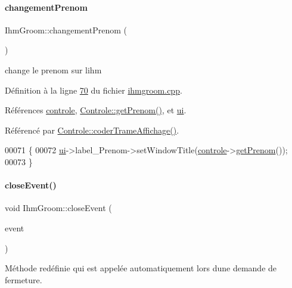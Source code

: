 \paragraph{\texorpdfstring{changement\+Prenom}{changementPrenom}}
{\footnotesize\ttfamily Ihm\+Groom\+::changement\+Prenom (\begin{DoxyParamCaption}{ }\end{DoxyParamCaption})\hspace{0.3cm}{\ttfamily [slot]}}



change le prenom sur l\textquotesingle{}ihm 



Définition à la ligne \hyperlink{ihmgroom_8cpp_source_l00070}{70} du fichier \hyperlink{ihmgroom_8cpp_source}{ihmgroom.\+cpp}.



Références \hyperlink{ihmgroom_8h_source_l00089}{controle}, \hyperlink{controle_8cpp_source_l00088}{Controle\+::get\+Prenom()}, et \hyperlink{ihmgroom_8h_source_l00085}{ui}.



Référencé par \hyperlink{controle_8cpp_source_l00101}{Controle\+::coder\+Trame\+Affichage()}.


\begin{DoxyCode}
00071 \{
00072     \hyperlink{class_ihm_groom_af652e1ce199213b7867e44cf589c06b8}{ui}->label\_Prenom->setWindowTitle(\hyperlink{class_ihm_groom_acead732c303b50a3285bd311ac8a3b4f}{controle}->\hyperlink{class_controle_a0164fd9066b1703498576095ab5642c5}{getPrenom}());
00073 \}
\end{DoxyCode}
\mbox{\label{class_ihm_groom_a8063930f323ce85b679c7598742f325d}} 
\paragraph{\texorpdfstring{close\+Event()}{closeEvent()}}
{\footnotesize\ttfamily void Ihm\+Groom\+::close\+Event (\begin{DoxyParamCaption}\item[{Q\+Close\+Event $\ast$}]{event }\end{DoxyParamCaption})\hspace{0.3cm}{\ttfamily [protected]}}



Méthode redéfinie qui est appelée automatiquement lors d\textquotesingle{}une demande de fermeture. 


